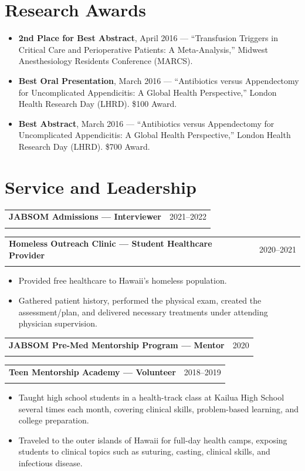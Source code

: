 \documentclass[10.5pt,letterpaper]{article}
\makeatletter
\newcommand{\cvitem}[3]{\begin{tabularx}{\textwidth}{@{}Xr@{}}\textbf{#1} & #2\\ #3 & \end{tabularx}\vspace{3pt}}
\makeatother
\begin{document}
\section{Research Awards}
\begin{itemize}
\item \textbf{2nd Place for Best Abstract}, April 2016 --- ``Transfusion Triggers in Critical Care and Perioperative Patients: A Meta-Analysis,'' Midwest Anesthesiology Residents Conference (MARCS).
\item \textbf{Best Oral Presentation}, March 2016 --- ``Antibiotics versus Appendectomy for Uncomplicated Appendicitis: A Global Health Perspective,'' London Health Research Day (LHRD). \$100 Award.
\item \textbf{Best Abstract}, March 2016 --- ``Antibiotics versus Appendectomy for Uncomplicated Appendicitis: A Global Health Perspective,'' London Health Research Day (LHRD). \$700 Award.
\end{itemize}

\section{Service and Leadership}
\cvitem{JABSOM Admissions --- Interviewer}{2021--2022}{}
\cvitem{Homeless Outreach Clinic --- Student Healthcare Provider}{2020--2021}{}
\begin{itemize}\item Provided free healthcare to Hawaii's homeless population.\item Gathered patient history, performed the physical exam, created the assessment/plan, and delivered necessary treatments under attending physician supervision.\end{itemize}
\vspace{3pt}
\cvitem{JABSOM Pre-Med Mentorship Program --- Mentor}{2020}{}
\cvitem{Teen Mentorship Academy --- Volunteer}{2018--2019}{}
\begin{itemize}\item Taught high school students in a health-track class at Kailua High School several times each month, covering clinical skills, problem-based learning, and college preparation.\item Traveled to the outer islands of Hawaii for full-day health camps, exposing students to clinical topics such as suturing, casting, clinical skills, and infectious disease.\end{itemize}
\vspace{3pt}
\end{document}
